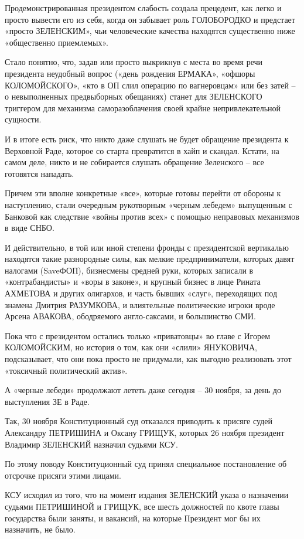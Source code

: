 Продемонстрированная президентом слабость создала прецедент, как легко и просто
вывести его из себя, когда он забывает роль ГОЛОБОРОДКО и предстает «просто
ЗЕЛЕНСКИМ», чьи человеческие качества находятся существенно ниже «общественно
приемлемых».   

Стало понятно, что, задав или просто выкрикнув с места во время речи президента
неудобный вопрос («день рождения ЕРМАКА», «офшоры КОЛОМОЙСКОГО», «кто в ОП слил
операцию по вагнеровцам» или без затей – о невыполненных предвыборных
обещаниях) станет для ЗЕЛЕНСКОГО триггером для механизма саморазоблачения своей
крайне непривлекательной сущности. 

И в итоге есть риск, что никто даже слушать не будет обращение президента к
Верховной Раде, которое со старта превратится в хайп и скандал. Кстати, на
самом деле, никто и не собирается слушать обращение Зеленского – все готовятся
нападать.

Причем эти вполне конкретные «все», которые готовы перейти от обороны к
наступлению, стали очередным рукотворным «черным лебедем» выпущенным с Банковой
как следствие «войны против всех» с помощью неправовых механизмов в виде СНБО.

И действительно, в той или иной степени фронды с президентской вертикалью
находятся такие разнородные силы, как мелкие предприниматели, которых давят
налогами (SaveФОП), бизнесмены средней руки, которых записали в
«контрабандисты» и «воры в законе», и крупный бизнес в лице Рината АХМЕТОВА и
других олигархов, и часть бывших «слуг», переходящих под знамена Дмитрия
РАЗУМКОВА, и влиятельные политические игроки вроде Арсена АВАКОВА, ободряемого
англо-саксами, и большинство СМИ. 

Пока что с президентом остались только «приватовцы» во главе с Игорем
КОЛОМОЙСКИМ, но история о том, как они «слили» ЯНУКОВИЧА, подсказывает, что они
пока просто не придумали, как выгодно реализовать этот «токсичный политический
актив».

А «черные лебеди» продолжают лететь даже сегодня – 30 ноября, за день до
выступления ЗЕ в Раде.

Так, 30 ноября Конституционный суд отказался приводить к присяге судей
Александру ПЕТРИШИНА и Оксану ГРИЩУК, которых 26 ноября президент Владимир
ЗЕЛЕНСКИЙ назначил судьями КСУ.

По этому поводу Конституционный суд принял специальное постановление об
отсрочке присяги этими лицами. 

КСУ исходил из того, что на момент издания ЗЕЛЕНСКИЙ указа о назначении судьями
ПЕТРИШИНОЙ и ГРИЩУК, все шесть должностей по квоте главы государства были
заняты, и вакансий, на которые Президент мог бы их назначить, не было.

